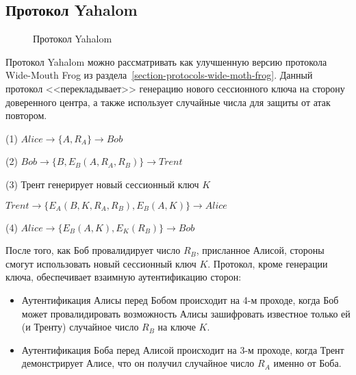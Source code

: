 \subsection{Протокол Yahalom}\label{section-protocols-yahalom}

\begin{figure}
	\centering
	\begin{sequencediagram}
		
	\end{sequencediagram}
	\caption{Протокол Yahalom\label{fig:key_distribution-yahalom}}
\end{figure}

Протокол Yahalom можно рассматривать как улучшенную версию протокола Wide-Mouth Frog из раздела~\ref{section-protocols-wide-moth-frog}. Данный протокол <<перекладывает>> генерацию нового сессионного ключа на сторону доверенного центра, а также использует случайные числа для защиты от атак повтором.

\begin{protocol}
	\item[(1)] $Alice \to \{ A, R_A \} \to Bob$
	\item[(2)] $Bob \to \{ B, E_B( A, R_A, R_B ) \} \to Trent$
	\item[(3)] Трент генерирует новый сессионный ключ $K$
	\item[{}] $Trent \to \{ E_A( B, K, R_A, R_B ), E_B(A, K) \} \to Alice$
	\item[(4)] $Alice \to \{ E_B( A, K ), E_K( R_B ) \} \to Bob$
\end{protocol}

После того, как Боб провалидирует число $R_B$, присланное Алисой, стороны смогут использовать новый сессионный ключ $K$. Протокол, кроме генерации ключа, обеспечивает взаимную аутентификацию сторон:

\begin{itemize}
    \item Аутентификация Алисы перед Бобом происходит на 4-м проходе, когда Боб может провалидировать возможность Алисы зашифровать известное только ей (и Тренту) случайное число $R_B$ на ключе $K$.
    \item Аутентификация Боба перед Алисой происходит на 3-м проходе, когда Трент демонстрирует Алисе, что он получил случайное число $R_A$ именно от Боба.
\end{itemize}

